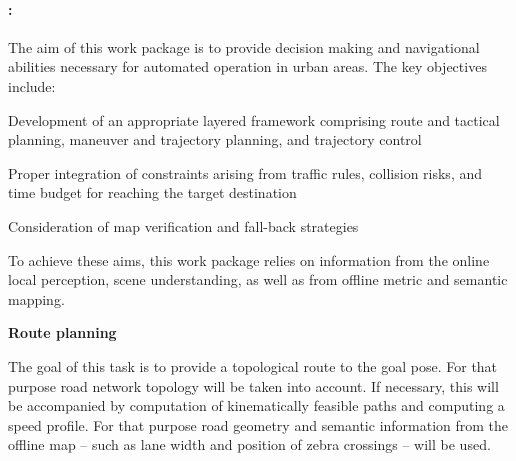 
\paragraph{\WPNavigation: \WPNavigationTitle \\}

{\noindent\wptablefont
\label{wp4}

\wptableheaderB{\WPNavigationVW}{\WPNavigationETHZ}{\WPNavigationIBM}{\WPNavigationCLUJ}{\WPNavigationPRAGUE}


The aim of this work package is to provide decision making and navigational abilities necessary for automated operation in urban areas. The key objectives include:
\begin{denseItemize}
\item Development of an appropriate layered framework comprising route and tactical planning, maneuver and trajectory planning, and trajectory control
\item Proper integration of constraints arising from traffic rules, collision risks, and time budget for reaching the target destination
\item Consideration of map verification and fall-back strategies
\end{denseItemize}
To achieve these aims, this work package relies on information from the online local perception, scene understanding, as well as from offline metric and semantic mapping.

\begin{tasks}{\WPNavigationNo}

\item  {\bf Route planning}
  \taskpartner{\VW}
	\label{task:wpnav:route}

The goal of this task is to provide a topological route to the goal pose. For that purpose road network topology will be taken into account. If necessary, this will be accompanied by computation of kinematically feasible paths and computing a speed profile. For that purpose road geometry and semantic information from the offline map -- such as lane width and position of zebra crossings -- will be used.





\end{tasks}}
